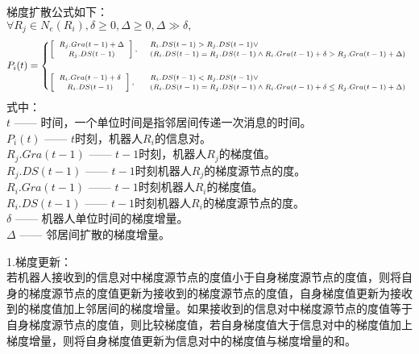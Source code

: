 梯度扩散公式如下：\\
${ \forall R_j \in N_e(R_i), \delta \geq 0, \Delta \geq 0, \Delta \gg \delta,}$ \\
\begin{equation}\scriptsize
	P_i(t) = 
	\begin{cases}
		\vspace{0.5cm}
		\left[
		\begin{array}{c}
			R_j.Gra(t-1) + \Delta \\
			R_j.DS(t-1)
		\end{array}
		\right], & 
		\begin{array}{l}
			R_i.DS(t-1) > R_j.DS(t-1) \vee \\
			(R_i.DS(t-1) = R_j.DS(t-1) \wedge R_i.Gra(t-1) +\delta > R_j.Gra(t-1) + \Delta)
		\end{array} \\
		
		\left[
		\begin{array}{c}
		R_i.Gra(t-1) + \delta \\
		R_i.DS(t-1)
		\end{array}
		\right], & 
		\begin{array}{l}
			R_i.DS(t-1) < R_j.DS(t-1) \vee \\
			(R_i.DS(t-1) = R_j.DS(t-1) \wedge R_i.Gra(t-1) +\delta \leq R_j.Gra(t-1) + \Delta)
		\end{array}		
	\end{cases} 
\end{equation}
式中：\\
\indent $t$ —— 时间，一个单位时间是指邻居间传递一次消息的时间。\\
\indent $P_i(t)$ —— $t$时刻，机器人$R_i$的信息对。\\
\indent $R_j.Gra(t-1)$ —— $t-1$时刻，机器人$R_j$的梯度值。\\
\indent $R_j.DS(t-1)$ —— $t-1$时刻机器人$R_j$的梯度源节点的度。\\
\indent $R_i.Gra(t-1)$ —— $t-1$时刻机器人$R_i$的梯度值。\\
\indent $R_i.DS(t-1)$ —— $t-1$时刻机器人$R_i$的梯度源节点的度。\\
\indent $\delta$ —— 机器人单位时间的梯度增量。\\
\indent $\Delta$ —— 邻居间扩散的梯度增量。

1.梯度更新：\\
\indent 若机器人接收到的信息对中梯度源节点的度值小于自身梯度源节点的度值，则将自身的梯度源节点的度值更新为接收到的梯度源节点的度值，自身梯度值更新为接收到的梯度值加上邻居间的梯度增量。如果接收到的信息对中梯度源节点的度值等于自身梯度源节点的度值，则比较梯度值，若自身梯度值大于信息对中的梯度值加上梯度增量，则将自身梯度值更新为信息对中的梯度值与梯度增量的和。


